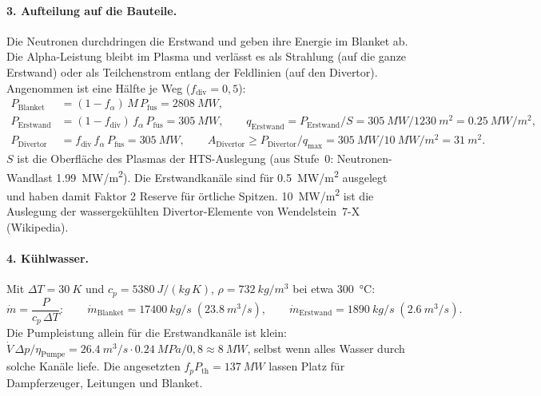 \documentclass[10pt,a4paper]{article}
\begin{document}
\paragraph{3. Aufteilung auf die Bauteile.} Die Neutronen durchdringen die Erstwand und geben ihre Energie im
Blanket ab. Die Alpha-Leistung bleibt im Plasma und verlässt es als Strahlung (auf die ganze Erstwand) oder
als Teilchenstrom entlang der Feldlinien (auf den Divertor). Angenommen ist eine Hälfte je Weg ($f_\text{div} = 0{,}5$):
\begin{align*}
P_\text{Blanket}  &= (1-f_\alpha)\,M\,P_\text{fus} = \SI{2808}{MW},\\
P_\text{Erstwand} &= (1-f_\text{div})\,f_\alpha\,P_\text{fus} = \SI{305}{MW},\qquad
q_\text{Erstwand} = P_\text{Erstwand}/S = \SI{305}{MW}/\SI{1230}{m^2} = \SI{0,25}{MW/m^2},\\
P_\text{Divertor} &= f_\text{div}\,f_\alpha\,P_\text{fus} = \SI{305}{MW},\qquad
A_\text{Divertor} \ge P_\text{Divertor}/q_\text{max} = \SI{305}{MW}/\SI{10}{MW/m^2} = \SI{31}{m^2}.
\end{align*}
$S$ ist die Oberfläche des Plasmas der HTS-Auslegung (aus Stufe~0: Neutronen-Wandlast \SI{1,99}{MW/m^2}).
Die Erstwandkanäle sind für \SI{0,5}{MW/m^2} ausgelegt und haben damit Faktor 2 Reserve für örtliche Spitzen.
\SI{10}{MW/m^2} ist die Auslegung der wassergekühlten Divertor-Elemente von Wendelstein~7-X (Wikipedia).

\paragraph{4. Kühlwasser.} Mit $\Delta T = \SI{30}{K}$ und $c_p = \SI{5380}{J/(kg\,K)}$, $\rho = \SI{732}{kg/m^3}$
bei etwa \SI{300}{\celsius}:
\[ \dot m = \frac{P}{c_p\,\Delta T}:\qquad \dot m_\text{Blanket} = \SI{17400}{kg/s}\;(\SI{23,8}{m^3/s}),\qquad
   \dot m_\text{Erstwand} = \SI{1890}{kg/s}\;(\SI{2,6}{m^3/s}). \]
Die Pumpleistung allein für die Erstwandkanäle ist klein: $\dot V\,\Delta p/\eta_\text{Pumpe} =
\SI{26,4}{m^3/s}\cdot\SI{0,24}{MPa}/0{,}8 \approx \SI{8}{MW}$, selbst wenn alles Wasser durch solche Kanäle
liefe. Die angesetzten $f_p P_\text{th} = \SI{137}{MW}$ lassen Platz für Dampferzeuger, Leitungen und Blanket.
\end{document}
